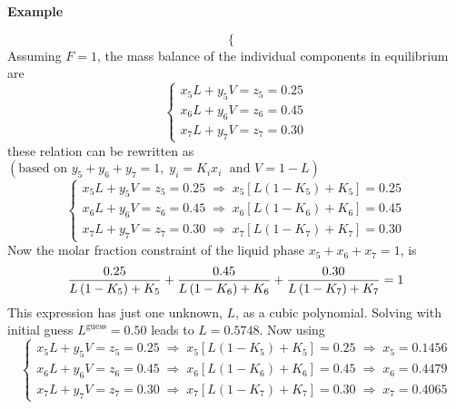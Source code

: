 \begin{MyExample}{\begin{center}{\bf Example}\end{center}}
\begin{displaymath}
\begin{cases}
        \end{cases}
   \end{displaymath}
   Assuming $F=1$, the mass balance of the individual components in equilibrium are
    \begin{displaymath}
        \begin{cases}
            x_{5}L + y_{5}V = z_{5} = 0.25 \\
            x_{6}L + y_{6}V = z_{6} = 0.45 \\
            x_{7}L + y_{7}V = z_{7} = 0.30            
        \end{cases}
   \end{displaymath}
   these relation can be rewritten as $\left(\text{based on }y_{5}+y_{6}+y_{7} = 1,\; y_{i}=K_{i}x_{i} \;\text{ and } V= 1-L\right)$
    \begin{displaymath}
        \begin{cases}
            x_{5}L + y_{5}V = z_{5} = 0.25 \;\Longrightarrow\; x_{5}\left[L\left(1-K_{5}\right)+K_{5}\right] = 0.25 \\
            x_{6}L + y_{6}V = z_{6} = 0.45 \;\Longrightarrow\; x_{6}\left[L\left(1-K_{6}\right)+K_{6}\right] = 0.45 \\
            x_{7}L + y_{7}V = z_{7} = 0.30 \;\Longrightarrow\; x_{7}\left[L\left(1-K_{7}\right)+K_{7}\right] = 0.30
        \end{cases}
   \end{displaymath}
   Now the molar fraction constraint of the liquid phase $x_{5}+x_{6}+x_{7} = 1$, is
   \begin{displaymath}
        \displaystyle\frac{0.25}{L\left(1-K_{5}\right)+K_{5}} + \displaystyle\frac{0.45}{L\left(1-K_{6}\right)+K_{6}} + \displaystyle\frac{0.30}{L\left(1-K_{7}\right)+K_{7}} = 1
   \end{displaymath}
   This expression has just one unknown, $L$, as a cubic polynomial. Solving with initial guess $L^{\text{guess}}=0.50$ leads to $L=0.5748$.  Now using 
    \begin{displaymath}
        \begin{cases}
            x_{5}L + y_{5}V = z_{5} = 0.25 \;\Longrightarrow\; x_{5}\left[L\left(1-K_{5}\right)+K_{5}\right] = 0.25  \;\Longrightarrow\;  x_{5} = 0.1456 \\
            x_{6}L + y_{6}V = z_{6} = 0.45 \;\Longrightarrow\; x_{6}\left[L\left(1-K_{6}\right)+K_{6}\right] = 0.45  \;\Longrightarrow\;  x_{6} = 0.4479 \\
            x_{7}L + y_{7}V = z_{7} = 0.30 \;\Longrightarrow\; x_{7}\left[L\left(1-K_{7}\right)+K_{7}\right] = 0.30  \;\Longrightarrow\;  x_{7} = 0.4065 

\end{cases}
\end{displaymath}
\end{MyExample}
